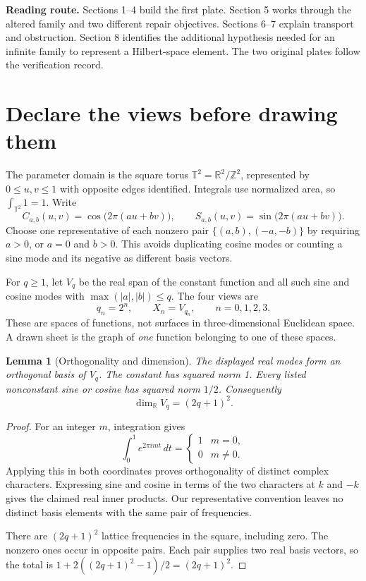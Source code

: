 \documentclass[11pt]{article}
\newtheorem{lemma}[theorem]{Lemma}
\theoremstyle{definition}
\theoremstyle{remark}
\newcommand{\R}{\mathbb R}
\newcommand{\Z}{\mathbb Z}
\newcommand{\T}{\mathbb T}
\begin{document}
\vspace{3mm}
\textbf{Reading route.} Sections 1--4 build the first plate. Section 5 works through the altered family and two different repair objectives. Sections 6--7 explain transport and obstruction. Section 8 identifies the additional hypothesis needed for an infinite family to represent a Hilbert-space element. The two original plates follow the verification record.

\clearpage

\section{Declare the views before drawing them}
\label{sec:views}
The parameter domain is the square torus $\T^2=\R^2/\Z^2$, represented by $0\leq u,v\leq1$ with opposite edges identified. Integrals use normalized area, so $\int_{\T^2}1=1$. Write
\[
 C_{a,b}(u,v)=\cos\bigl(2\pi(au+bv)\bigr),\qquad
 S_{a,b}(u,v)=\sin\bigl(2\pi(au+bv)\bigr).
\]
Choose one representative of each nonzero pair $\{(a,b),(-a,-b)\}$ by requiring $a>0$, or $a=0$ and $b>0$. This avoids duplicating cosine modes or counting a sine mode and its negative as different basis vectors.

For $q\geq1$, let $V_q$ be the real span of the constant function and all such sine and cosine modes with $\max(|a|,|b|)\leq q$. The four views are
\[
 q_n=2^n,\qquad X_n=V_{q_n},\qquad n=0,1,2,3.
\]
These are spaces of functions, not surfaces in three-dimensional Euclidean space. A drawn sheet is the graph of \emph{one} function belonging to one of these spaces.

\begin{lemma}[Orthogonality and dimension]
The displayed real modes form an orthogonal basis of $V_q$. The constant has squared norm 1. Every listed nonconstant sine or cosine has squared norm $1/2$. Consequently
\[
 \dim_{\R}V_q=(2q+1)^2.
\]
\end{lemma}
\begin{proof}
For an integer $m$, integration gives
\[
 \int_0^1 e^{2\pi i mt}\,dt=
 \begin{cases}1&m=0,\\0&m\neq0.\end{cases}
\]
Applying this in both coordinates proves orthogonality of distinct complex characters. Expressing sine and cosine in terms of the two characters at $k$ and $-k$ gives the claimed real inner products. Our representative convention leaves no distinct basis elements with the same pair of frequencies.

There are $(2q+1)^2$ lattice frequencies in the square, including zero. The nonzero ones occur in opposite pairs. Each pair supplies two real basis vectors, so the total is
$1+2((2q+1)^2-1)/2=(2q+1)^2$.
\end{proof}
\end{document}
